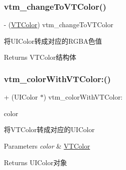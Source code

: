 \subsubsection{\texorpdfstring{vtm\+\_\+change\+To\+V\+T\+Color()}{vtm\_changeToVTColor()}\hspace{0.1cm}{\footnotesize\ttfamily [3/3]}}
{\footnotesize\ttfamily -\/ (\mbox{\hyperlink{struct_v_t_color}{V\+T\+Color}}) vtm\+\_\+change\+To\+V\+T\+Color \begin{DoxyParamCaption}{ }\end{DoxyParamCaption}}

将\+U\+I\+Color转成对应的\+R\+G\+B\+A色值

\begin{DoxyReturn}{Returns}
V\+T\+Color结构体 
\end{DoxyReturn}
\mbox{\label{category_u_i_color_07_magic_08_aafad3d97a89e9f3d60a4237c7e3e5b3b}} 
\subsubsection{\texorpdfstring{vtm\+\_\+color\+With\+V\+T\+Color\+:()}{vtm\_colorWithVTColor:()}\hspace{0.1cm}{\footnotesize\ttfamily [1/3]}}
{\footnotesize\ttfamily + (U\+I\+Color $\ast$) vtm\+\_\+color\+With\+V\+T\+Color\+: \begin{DoxyParamCaption}\item[{(\mbox{\hyperlink{struct_v_t_color}{V\+T\+Color}})}]{color }\end{DoxyParamCaption}}

将\+V\+T\+Color转成对应的\+U\+I\+Color


\begin{DoxyParams}{Parameters}
{\em color} & \mbox{\hyperlink{struct_v_t_color}{V\+T\+Color}}\\
\hline
\end{DoxyParams}
\begin{DoxyReturn}{Returns}
U\+I\+Color对象 
\end{DoxyReturn}
\mbox{\label{category_u_i_color_07_magic_08_aafad3d97a89e9f3d60a4237c7e3e5b3b}} 

